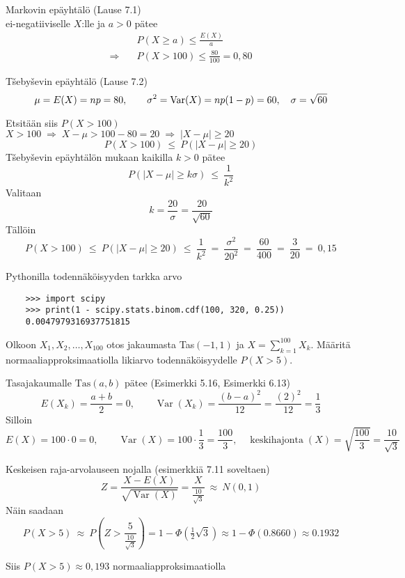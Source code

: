 \documentclass[12pt,a4paper]{article}
\begin{document}
\begin{kohta}
  \item Markovin epäyhtälö (Lause 7.1)\\
  ei-negatiiviselle $X$:lle ja $a>0$ pätee
  \[
  \begin{aligned}
  &P(X\ge a)\le \frac{E(X)}{a}\\
  \Rightarrow \quad &P(X> 100)\le \frac{80}{100}=0{,}80
  \end{aligned}
  \]


\item T\v{s}eby\v{s}evin epäyhtälö (Lause 7.2)\\


\[
\mu=E(X)=np=80,\qquad \sigma^2=\operatorname{Var}(X)=np(1-p)=60,\quad \sigma=\sqrt{60}
\]

Etsitään siis $P(X>100)$ \\
$X>100 \;\Rightarrow\; X-\mu > 100-80 = 20 \;\Rightarrow\; |X-\mu|\ge 20$
\[
P(X>100)\ \le\ P(|X-\mu|\ge 20)
\]
T\v{s}eby\v{s}evin epäyhtälön mukaan kaikilla $k>0$ pätee
\[
P(|X-\mu|\ge k\sigma)\ \le\ \frac{1}{k^2}
\]
Valitaan\\
\[
k=\dfrac{20}{\sigma}=\dfrac{20}{\sqrt{60}}
\]
Tällöin
\[
P(X>100)\ \le\ P(|X-\mu|\ge 20)
\ \le\ \frac{1}{k^2}
\ =\ \frac{\sigma^2}{20^2}
\ =\ \frac{60}{400}
\ =\ \frac{3}{20}
\ =\ 0{,}15
\]

\item Pythonilla todennäköisyyden tarkka arvo
\begin{verbatim}
    >>> import scipy
    >>> print(1 - scipy.stats.binom.cdf(100, 320, 0.25))
    0.0047979316937751815
\end{verbatim}
\end{kohta}





\pagebreak

Olkoon ${X_1, X_2,\ldots, X_{100}}$ otos jakaumasta Tas$(-1,1)$ ja $X=\sum_{k=1}^{100} X_k$. Määritä normaaliapproksimaatiolla likiarvo todennäköisyydelle $P(X>5)$.
\vspace{0.4cm}

Tasajakaumalle $\mathrm{Tas}(a,b)$ pätee (Esimerkki 5.16, Esimerkki 6.13)
\[
E(X_k)=\frac{a+b}{2}=0,\qquad
\operatorname{Var}(X_k)=\frac{(b-a)^2}{12}=\frac{(2)^2}{12}=\frac{1}{3}
\]
Silloin
\[
E(X)=100\cdot 0=0,\qquad
\operatorname{Var}(X)=100\cdot \frac{1}{3}=\frac{100}{3},\quad
\operatorname{keskihajonta}(X)=\sqrt{\frac{100}{3}}=\frac{10}{\sqrt{3}}
\]

Keskeisen raja-arvolauseen nojalla (esimerkkiä 7.11 soveltaen)
\[
Z=\frac{X-E(X)}{\sqrt{\operatorname{Var}(X)}}=\frac{X}{\frac{10}{\sqrt{3}}}\ \approx\ N(0,1)
\]
Näin saadaan
\[
P(X>5)\ \approx\ P\!\left(
    Z>\frac{5}{\frac{10}{\sqrt{3}}}
    \right)
=1-\Phi\!\left(\tfrac12\sqrt{3}\right)
\approx 1-\Phi(0.8660)
\approx 0.1932
\]

Siis \(P(X>5)\approx 0{,}193\) normaaliapproksimaatiolla
\end{document}
